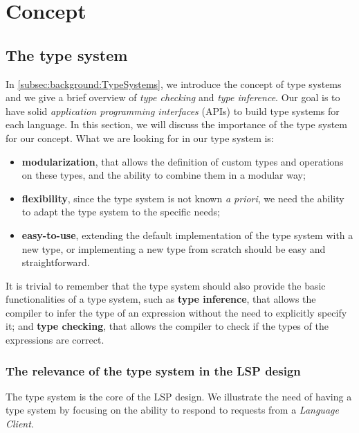 \chapter{Concept}\label{chap:Concept}


\section{The type system}\label{sec:concept:TypeSystem}

In \ref{subsec:background:TypeSystems}, we introduce the concept of type systems and we give a brief overview of \textit{type checking} and \textit{type inference}. Our goal is to have solid \textit{application programming interfaces} (APIs) to build type systems for each language.
In this section, we will discuss the importance of the type system for our concept.
What we are looking for in our type system is:
\begin{itemize}
    \item \textbf{modularization}, that allows the definition of custom types and operations on these types, and the ability to combine them in a modular way;
    \item \textbf{flexibility}, since the type system is not known \textit{a priori}, we need the ability to adapt the type system to the specific needs;
    \item \textbf{easy-to-use}, extending the default implementation of the type system with a new type, or implementing a new type from scratch should be easy and straightforward.
\end{itemize}

It is trivial to remember that the type system should also provide the basic functionalities of a type system, such as \textbf{type inference}, that allows the compiler to infer the type of an expression without the need to explicitly specify it; and \textbf{type checking}, that allows the compiler to check if the types of the expressions are correct.

\subsection{The relevance of the type system in the LSP design}\label{subsec:concept:RelevanceOfTheTypeSystem}

The type system is the core of the LSP design. We illustrate the need of having a type system by focusing on the ability to respond to requests from a \textit{Language Client}.

